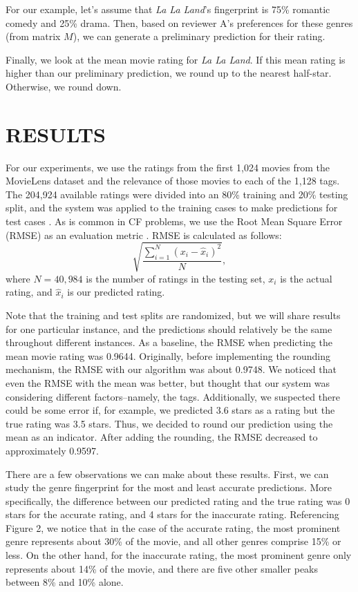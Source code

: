 \documentclass[letterpaper, 10 pt, conference]{ieeeconf}  %
\begin{document}
For our example, let's assume that \textit{La La Land}'s fingerprint is 75\% romantic comedy and 25\% drama. Then, based on reviewer A's preferences for these genres (from matrix $M$), we can generate a preliminary prediction for their rating.

Finally, we look at the mean movie rating for \textit{La La Land}. If this mean rating is higher than our preliminary prediction, we round up to the nearest half-star. Otherwise, we round down.

\section{RESULTS}

For our experiments, we use the ratings from the first 1,024 movies from the MovieLens dataset and the relevance of those movies to each of the 1,128 tags. The 204,924 available ratings were divided into an 80\% training and 20\% testing split, and the system was applied to the training cases to make predictions for test cases \cite{lenskitmodule}. As is common in CF problems, we use the Root Mean Square Error (RMSE) as an evaluation metric \cite{lenskitmodule}. RMSE is calculated as follows: 
$$\sqrt{\frac{\sum_{i=1}^N (x_i - \hat{x}_i)^2}{N}},$$
where $N=40,984$ is the number of ratings in the testing set, $x_i$ is the actual rating, and $\hat{x}_i$ is our predicted rating.

Note that the training and test splits are randomized, but we will share results for one particular instance, and the predictions should relatively be the same throughout different instances. As a baseline, the RMSE when predicting the mean movie rating was 0.9644. Originally, before implementing the rounding mechanism, the RMSE with our algorithm was about 0.9748. We noticed that even the RMSE with the mean was better, but thought that our system was considering different factors--namely, the tags. Additionally, we suspected there could be some error if, for example, we predicted 3.6 stars as a rating but the true rating was 3.5 stars. Thus, we decided to round our prediction using the mean as an indicator. After adding the rounding, the RMSE decreased to approximately 0.9597. 

There are a few observations we can make about these results. First, we can study the genre fingerprint for the most and least accurate predictions. More specifically, the difference between our predicted rating and the true rating was 0 stars for the accurate rating, and 4 stars for the inaccurate rating. Referencing Figure 2, we notice that in the case of the accurate rating, the most prominent genre represents about 30\% of the movie, and all other genres comprise 15\% or less. On the other hand, for the inaccurate rating, the most prominent genre only represents about 14\% of the movie, and there are five other smaller peaks between 8\% and 10\% alone.
\end{document}
